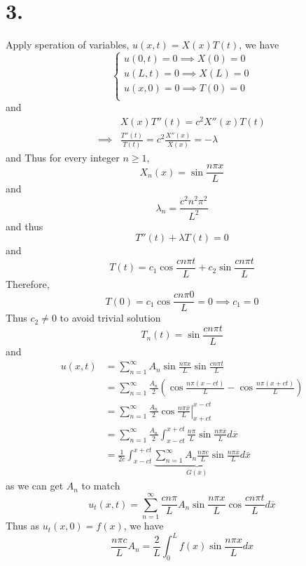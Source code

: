 \documentclass[11pt]{article}
\theoremstyle{mystyle}
\theoremstyle{definition}
\begin{document}
\section*{3.}
Apply speration of variables, $u(x,t) = X(x) T(t)$, we have  \\
\[
  \begin{cases}
    u(0,t) = 0 \implies X(0) = 0 \\
    u(L,t) = 0 \implies X(L) = 0 \\
    u(x,0) = 0 \implies T(0) = 0 \\
  \end{cases}
\]
and 
\begin{align*}
  &X(x) T''(t) = c^2 X''(x)T(t) \\
  \implies & \displaystyle\frac{T''(t)}{T(t)} = c^2 \displaystyle\frac{X''(x)}{X(x)} = -\lambda
\end{align*}
and
Thus for every integer $n\ge 1$,  
\[
  X_n(x) = \sin \displaystyle\frac{n\pi x}{L}
\]
and 
\[
  \lambda_n =  \displaystyle\frac{c^2 n^2\pi^2}{L^2}
\]
and thus 
\[
  T''(t) + \lambda T(t) = 0 
\]
and 
\[
  T(t) = c_1 \cos \displaystyle\frac{cn\pi t}{L} + c_2 \sin \displaystyle\frac{cn \pi t}{L}
\]
Therefore, 
\[
  T(0) = c_1 \cos \displaystyle\frac{cn\pi 0}{L} = 0 \implies c_1 = 0
\]
Thus $c_2 \ne 0$ to avoid trivial solution
\[
  T_n(t) = \sin \displaystyle\frac{cn\pi t}{L} 
\]
and 
\begin{align*}
  u(x,t) &= \sum_{n=1}^\infty A_n \sin \displaystyle\frac{n\pi x}{L} \sin \displaystyle\frac{cn\pi t}{L} \\
  &= \sum_{n=1}^\infty \displaystyle\frac{A_n}{2} \left( \cos \displaystyle\frac{n\pi(x-ct)}{L} - \cos \displaystyle\frac{n\pi (x+ct)}{L} \right) \\ 
  &= \sum_{n=1}^\infty \displaystyle\frac{A_n}{2} \left. \cos \displaystyle\frac{n\pi \overline{x}}{L} \right|_{x+ct}^{x-ct} \\
  &= \sum_{n=1}^\infty \displaystyle\frac{A_n}{2} \int_{x-ct}^{x+ct} \displaystyle\frac{n\pi}{L}\sin \displaystyle\frac{n\pi \overline{x}}{L} d \overline{x} \\
  &= \displaystyle\frac{1}{2c} \int_{x-ct}^{x+ct} \underbrace{\sum_{n=1}^\infty A_n \displaystyle\frac{n\pi c}{L} \sin \displaystyle\frac{n\pi \overline{x}}{L}}_{G(\overline{x})} d\overline{x}
\end{align*}
as we can get $A_n$ to match 
\[
  u_t(x,t) = \sum_{n=1}^\infty \displaystyle\frac{cn\pi}{L} A_n \sin \displaystyle\frac{n\pi x}{L} \cos \displaystyle\frac{cn\pi t}{L} d\overline{x}
\]
Thus as $u_t(x,0) = f(x)$, we have  
\[
  \displaystyle\frac{n \pi c}{L}A_n = \displaystyle\frac{2}{L} \int_0^L f(x) \sin \displaystyle\frac{n\pi x}{L} dx 
\]
\newpage
\end{document}
